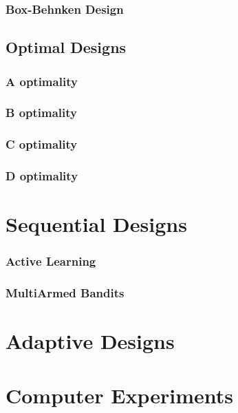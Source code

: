 \subsubsection{Box-Behnken Design}

\subsection{Optimal Designs}

\subsubsection{A optimality}
\subsubsection{B optimality}
\subsubsection{C optimality}
\subsubsection{D optimality}




\section{Sequential Designs}

\subsubsection{Active Learning}


\subsubsection{MultiArmed Bandits}




\section{Adaptive Designs}



\section{Computer Experiments}

